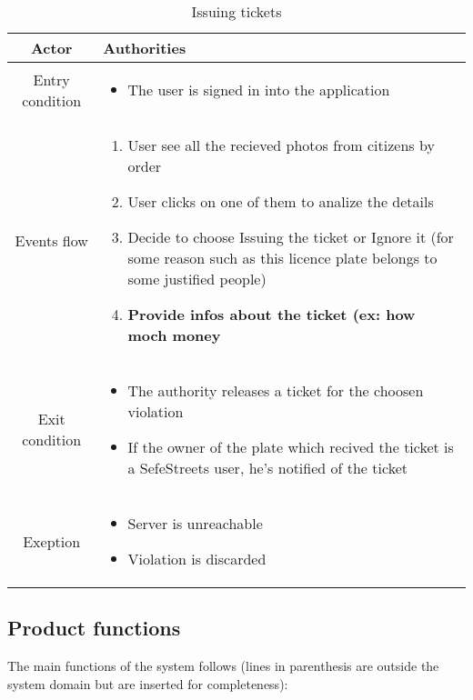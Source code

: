 \documentclass{article}
\begin{document}
		\begin{table} [H]
		\begin{center}
		\caption{Issuing tickets}
		\begin{tabular}{|c|p{8cm}|}
			\hline
			Actor&Authorities\\
			\hline
			Entry condition& \begin{itemize}
								\item The user is signed in into the application
							\end{itemize}\\
			\hline
			 Events flow& \begin{enumerate}
							\item User see all the recieved photos from citizens by order
							\item User clicks on one of them to analize the details
							\item Decide to choose Issuing the ticket or Ignore it (for some reason such as this licence plate belongs to some justified people)
							\item \textbf{Provide infos about the ticket (ex: how moch money}
						\end{enumerate}\\
			\hline
			Exit condition& \begin{itemize}
								\item The authority releases a ticket for the choosen violation
								\item If the owner of the plate which recived the ticket is a SefeStreets user, he's notified of the ticket
							\end{itemize}\\
			\hline
			Exeption& \begin{itemize}
						\item Server is unreachable
						\item Violation is discarded
					\end{itemize}\\
			\hline
		\end{tabular}
		\end{center}
		\end{table} 
	\newpage
	\subsection{Product functions}
	The main functions of the system follows (lines in parenthesis are outside the system domain but are inserted for completeness):
\end{document}
